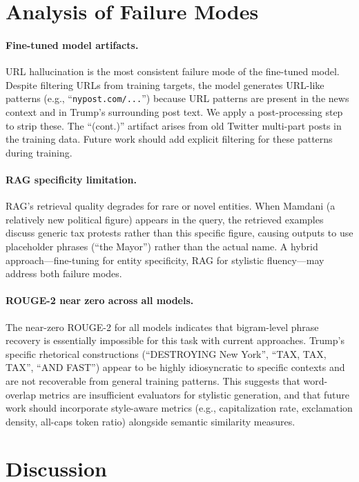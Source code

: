 \documentclass[11pt,a4paper]{article}
\begin{document}
\section{Analysis of Failure Modes}
\label{sec:failures}

\paragraph{Fine-tuned model artifacts.}
URL hallucination is the most consistent failure mode of the fine-tuned model. Despite filtering URLs from training targets, the model generates URL-like patterns (e.g., ``\texttt{nypost.com/...}'') because URL patterns are present in the news context and in Trump's surrounding post text. We apply a post-processing step to strip these. The ``(cont.)'' artifact arises from old Twitter multi-part posts in the training data. Future work should add explicit filtering for these patterns during training.

\paragraph{RAG specificity limitation.}
RAG's retrieval quality degrades for rare or novel entities. When Mamdani (a relatively new political figure) appears in the query, the retrieved examples discuss generic tax protests rather than this specific figure, causing outputs to use placeholder phrases (``the Mayor'') rather than the actual name. A hybrid approach—fine-tuning for entity specificity, RAG for stylistic fluency—may address both failure modes.

\paragraph{ROUGE-2 near zero across all models.}
The near-zero ROUGE-2 for all models indicates that bigram-level phrase recovery is essentially impossible for this task with current approaches. Trump's specific rhetorical constructions (``DESTROYING New York'', ``TAX, TAX, TAX'', ``AND FAST'') appear to be highly idiosyncratic to specific contexts and are not recoverable from general training patterns. This suggests that word-overlap metrics are insufficient evaluators for stylistic generation, and that future work should incorporate style-aware metrics (e.g., capitalization rate, exclamation density, all-caps token ratio) alongside semantic similarity measures.

\section{Discussion}
\end{document}
